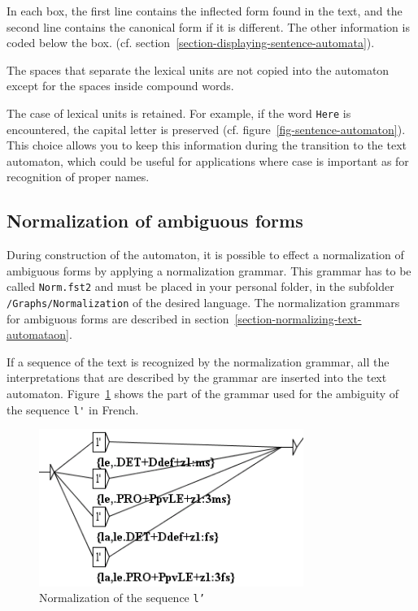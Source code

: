 \bigskip
\noindent In each box, the first line contains the inflected form found in the
text, and the second line contains the canonical form if it is different. The other
information is coded below the box.
(cf. section~\ref{section-displaying-sentence-automata}).

\bigskip
\noindent The spaces that separate the lexical units are not copied into the
automaton except for the spaces inside compound words.

\bigskip
\noindent The case of lexical units is retained. For example, if the word
\verb+Here+ is encountered, the capital letter is preserved (cf.
figure~\ref{fig-sentence-automaton}). This choice allows you to
keep this information during the transition to the text automaton,
which could be useful for applications where case is important as for
recognition of proper names.

\subsection{Normalization of ambiguous forms}
During construction of the automaton, it is possible to effect a normalization of
ambiguous forms by applying a normalization grammar. This grammar has to be
called \verb+Norm.fst2+ and must be placed in your personal folder, in the
subfolder \verb+/Graphs/Normalization+ of the desired language. The normalization
grammars for ambiguous forms are described in
section~\ref{section-normalizing-text-automataon}.

\bigskip
\noindent If a sequence of the text is recognized by the normalization grammar, all the
interpretations that are described by the grammar are inserted into the text
automaton.
Figure~\ref{fig-example-tfst-normalization-graph} shows
the part of the grammar used for the ambiguity of the sequence \verb+l'+ in French.

\begin{figure}[!ht]
\begin{center}
\includegraphics[width=8.6cm]{resources/img/fig7-4.png}
\caption{Normalization of the sequence \texttt{l'}\label{fig-example-tfst-normalization-graph}}
\end{center}
\end{figure}


